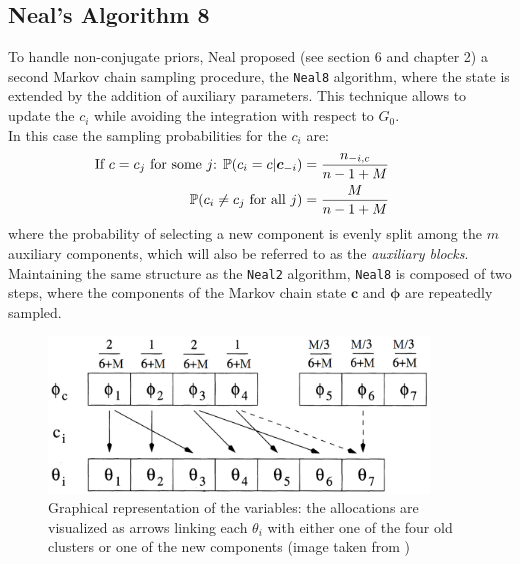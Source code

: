 \subsection{Neal's Algorithm 8} \label{neal8}
To handle non-conjugate priors, Neal proposed (see \cite{neal} section 6 and \cite{book} chapter 2) a second Markov chain sampling procedure, the \verb|Neal8| algorithm, where the state is extended by the addition of auxiliary parameters.
This technique allows to update the $c_i$ while avoiding the integration with respect to $G_0$. \\
In this case the sampling probabilities for the $c_i$ are:
\begin{equation}
	\begin{aligned}
		\hspace{-25pt}
		\vspace{-12pt}
		\text{If $c=c_j$ for some $j$: } \PP(c_i=c | \boldsymbol c_{-i}) &= \frac{n_{-i,c}}{n-1+M}   \\
		\PP(c_{i}\neq c_{j} \text{ for all } j) &=\frac{M }{n-1+M}
	\end{aligned}	
\end{equation}
where the probability of selecting a new component is evenly split among the $m$ auxiliary components, which will also be referred to as the \emph{auxiliary blocks}.
Maintaining the same structure as the \verb|Neal2| algorithm, \verb|Neal8| is composed of two steps, where the components of the Markov chain state $\boldsymbol c$ and $\boldsymbol\phi$ are repeatedly sampled.
\begin{figure}[h]
    \centering
    \includegraphics[width=0.9\textwidth]{etc/neal8.png}
    \captionsetup{labelformat=empty}
    \caption{Graphical representation of the variables: the allocations are visualized as arrows linking each $\theta_i$ with either one of the four old clusters or one of the new components (image taken from \cite{neal})}
    \label{fig:neal8}
\end{figure}

